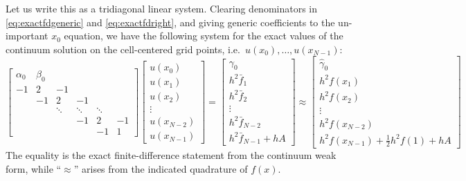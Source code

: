 \documentclass[12pt]{amsart}
\begin{document}
Let us write this as a tridiagonal linear system.  Clearing denominators in \eqref{eq:exactfdgeneric} and \eqref{eq:exactfdright}, and giving generic coefficients to the un-important $x_0$ equation, we have the following system for the exact values of the continuum solution on the cell-centered grid points, i.e.~$u(x_0),\dots,u(x_{N-1})$:
\begin{equation}
\begin{bmatrix}
\alpha_0 & \beta_0 & & & & \\
-1 & 2 & -1 & & & \\
   & -1 & 2 & -1 & & \\
 & & \ddots & \ddots & \ddots & \\
 & & & -1 & 2 & -1 \\
 & & & & -1 & 1
\end{bmatrix}
\begin{bmatrix}
u(x_0) \\ u(x_1) \\ u(x_2) \\ \vdots \\ u(x_{N-2}) \\ u(x_{N-1})
\end{bmatrix}
=
\begin{bmatrix}
\gamma_0 \\
h^2 \bar f_1 \\
h^2 \bar f_2 \\
\vdots \\
h^2 \bar f_{N-2} \\
h^2 \bar f_{N-1} + h A
\end{bmatrix}
\approx
\begin{bmatrix}
\hat\gamma_0 \\
h^2 f(x_1) \\
h^2 f(x_2) \\
\vdots \\
h^2 f(x_{N-2}) \\
h^2 f(x_{N-1}) + \frac{1}{2} h^2 f(1) + h A
\end{bmatrix}
\label{eq:linsys}
\end{equation}
The equality is the exact finite-difference statement from the continuum weak form, while ``$\approx$'' arises from the indicated quadrature of $f(x)$.
\end{document}
